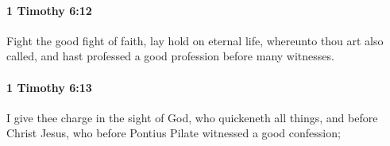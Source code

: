 		\paragraph{1 Timothy 6:12} %
			\label{1TIMOTHY-6-12}

			Fight the good fight of faith, lay hold on eternal life, whereunto thou art also called, and hast professed a good profession before many witnesses.

			\begin{framed}
			\scriptsize
				\begin{compactdesc}
					\item[SBLG] 
				\end{compactdesc}
			\end{framed}

		\paragraph{1 Timothy 6:13} %
			\label{1TIMOTHY-6-13}

			I give thee charge in the sight of God, who quickeneth all things, and before Christ Jesus, who before Pontius Pilate witnessed a good confession;

